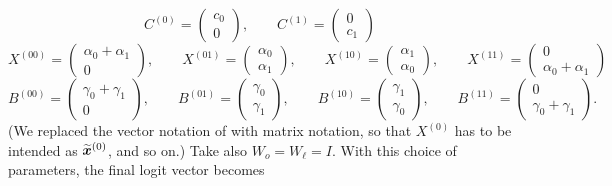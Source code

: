 \begin{equation}
C^{(0)} = \begin{pmatrix}
c_0 \\
0
\end{pmatrix}, \qquad
C^{(1)} = \begin{pmatrix}
0 \\
c_1
\end{pmatrix}
\end{equation}
\begin{equation}
X^{(00)} = \begin{pmatrix}
\alpha_0 + \alpha_1 \\
0
\end{pmatrix}, \qquad
X^{(01)} = \begin{pmatrix}
\alpha_0 \\
\alpha_1
\end{pmatrix}, \qquad
X^{(10)} = \begin{pmatrix}
\alpha_1 \\
\alpha_0
\end{pmatrix}, \qquad
X^{(11)} = \begin{pmatrix}
0 \\
\alpha_0 + \alpha_1
\end{pmatrix}
\end{equation}
\begin{equation}
B^{(00)} = \begin{pmatrix}
\gamma_0 + \gamma_1 \\
0
\end{pmatrix}, \qquad
B^{(01)} = \begin{pmatrix}
\gamma_0 \\
\gamma_1
\end{pmatrix}, \qquad
B^{(10)} = \begin{pmatrix}
\gamma_1 \\
\gamma_0
\end{pmatrix}, \qquad
B^{(11)} = \begin{pmatrix}
0 \\
\gamma_0 + \gamma_1
\end{pmatrix}.
\end{equation}
(We replaced the vector notation of  with matrix notation, so that $X^{(0)}$ has to be intended as $\widetilde{\boldsymbol{x}}^{(0)}$, and so on.)
Take also $W_o = W_{\ell} = I$. With this choice of parameters, the final logit vector becomes
